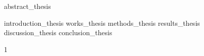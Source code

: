 \documentclass{article}
\begin{document}

  {abstract_thesis}
  \restoregeometry

\twocolumn
  {introduction_thesis}
  {works_thesis}
  {methods_thesis}
  {results_thesis}
  {discussion_thesis}
  {conclusion_thesis}

\onecolumn
  \printbibliography
  \clearpage

\begin{refsection}

\twocolumn
\appendix
  {1}
  \clearpage
\onecolumn  
  \printbibliography
\end{refsection}
    
\end{document}
